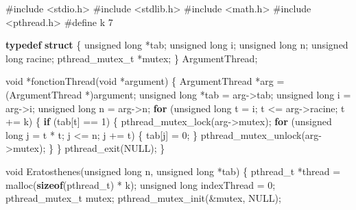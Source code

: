 \documentclass[
]{article}
\newenvironment{Shaded}{}{}
\newcommand{\ControlFlowTok}[1]{\textcolor[rgb]{0.00,0.44,0.13}{\textbf{#1}}}
\newcommand{\DataTypeTok}[1]{\textcolor[rgb]{0.56,0.13,0.00}{#1}}
\newcommand{\DecValTok}[1]{\textcolor[rgb]{0.25,0.63,0.44}{#1}}
\newcommand{\ImportTok}[1]{#1}
\newcommand{\KeywordTok}[1]{\textcolor[rgb]{0.00,0.44,0.13}{\textbf{#1}}}
\newcommand{\NormalTok}[1]{#1}
\newcommand{\PreprocessorTok}[1]{\textcolor[rgb]{0.74,0.48,0.00}{#1}}
\begin{document}
\begin{Shaded}
\begin{Highlighting}[]
\PreprocessorTok{\#include }\ImportTok{\textless{}stdio.h\textgreater{}}
\PreprocessorTok{\#include }\ImportTok{\textless{}stdlib.h\textgreater{}}
\PreprocessorTok{\#include }\ImportTok{\textless{}math.h\textgreater{}}
\PreprocessorTok{\#include }\ImportTok{\textless{}pthread.h\textgreater{}}
\PreprocessorTok{\#define k 7}

\KeywordTok{typedef} \KeywordTok{struct}
\NormalTok{\{}
    \DataTypeTok{unsigned} \DataTypeTok{long}\NormalTok{ *tab;}
    \DataTypeTok{unsigned} \DataTypeTok{long}\NormalTok{ i;}
    \DataTypeTok{unsigned} \DataTypeTok{long}\NormalTok{ n;}
    \DataTypeTok{unsigned} \DataTypeTok{long}\NormalTok{ racine;}
\NormalTok{    pthread\_mutex\_t *mutex;}
\NormalTok{\} ArgumentThread;}

\DataTypeTok{void}\NormalTok{ *fonctionThread(}\DataTypeTok{void}\NormalTok{ *argument)}
\NormalTok{\{}
\NormalTok{    ArgumentThread *arg = (ArgumentThread *)argument;}
    \DataTypeTok{unsigned} \DataTypeTok{long}\NormalTok{ *tab = arg{-}\textgreater{}tab;}
    \DataTypeTok{unsigned} \DataTypeTok{long}\NormalTok{ i = arg{-}\textgreater{}i;}
    \DataTypeTok{unsigned} \DataTypeTok{long}\NormalTok{ n = arg{-}\textgreater{}n;}
    \ControlFlowTok{for}\NormalTok{ (}\DataTypeTok{unsigned} \DataTypeTok{long}\NormalTok{ t = i; t \textless{}= arg{-}\textgreater{}racine; t += k)}
\NormalTok{    \{}
        \ControlFlowTok{if}\NormalTok{ (tab[t] == }\DecValTok{1}\NormalTok{)}
\NormalTok{        \{}
\NormalTok{            pthread\_mutex\_lock(arg{-}\textgreater{}mutex);}
            \ControlFlowTok{for}\NormalTok{ (}\DataTypeTok{unsigned} \DataTypeTok{long}\NormalTok{ j = t * t; j \textless{}= n; j += t)}
\NormalTok{            \{}
\NormalTok{                tab[j] = }\DecValTok{0}\NormalTok{;}
\NormalTok{            \}}
\NormalTok{            pthread\_mutex\_unlock(arg{-}\textgreater{}mutex);}
\NormalTok{        \}}
\NormalTok{    \}}
\NormalTok{    pthread\_exit(NULL);}
\NormalTok{\}}

\DataTypeTok{void}\NormalTok{ Eratosthenes(}\DataTypeTok{unsigned} \DataTypeTok{long}\NormalTok{ n, }\DataTypeTok{unsigned} \DataTypeTok{long}\NormalTok{ *tab)}
\NormalTok{\{}
\NormalTok{    pthread\_t *thread = malloc(}\KeywordTok{sizeof}\NormalTok{(pthread\_t) * k);}
    \DataTypeTok{unsigned} \DataTypeTok{long}\NormalTok{ indexThread = }\DecValTok{0}\NormalTok{;}
\NormalTok{    pthread\_mutex\_t mutex;}
\NormalTok{    pthread\_mutex\_init(\&mutex, NULL);}
    

\end{Highlighting}
\end{Shaded}
\end{document}

